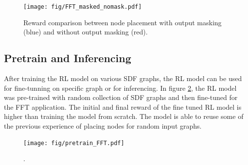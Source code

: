 \begin{figure}[h]
  \centering
  \texttt{[image: fig/FFT\_masked\_nomask.pdf]}
  \caption{Reward comparison between node placement with output masking (blue) and without output masking (red).}
  \label{fig:mask_nomask}
\end{figure}

\subsection{Pretrain and Inferencing}

After training the RL model on various SDF graphs, the RL model can be used for fine-tunning on specific graph or for inferencing.
In figure \ref{fig:pretrain_FFT}, the RL model was pre-trained with random collection of SDF graphs and then fine-tuned for the FFT application.
The initial and final reward of the fine tuned RL model is higher than training the model from scratch.
The model is able to reuse some of the previous experience of placing nodes for random input graphs.

\begin{figure}[h]
  \centering
  \texttt{[image: fig/pretrain\_FFT.pdf]}
  \caption{.}
  \label{fig:pretrain_FFT}
\end{figure}
